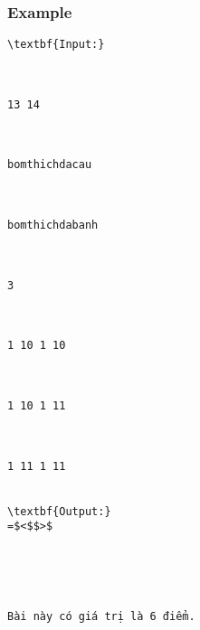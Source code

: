 \subsubsection{   Example  }
\begin{verbatim}
\textbf{Input:}



13 14



bomthichdacau



bomthichdabanh



3



1 10 1 10



1 10 1 11



1 11 1 11


\textbf{Output:}
=$<$$>$





Bài này có giá trị là 6 điểm.\end{verbatim}
